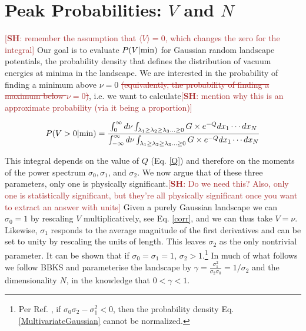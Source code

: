 \documentclass[12pt]{article}
\newcommand{\re}[1]{\textcolor{blue}{[{\bf RE}: #1]}}
\newcommand{\SH}[1]{\textcolor{brown}{[{\bf SH}: #1]}}
\newcommand{\sh}[1]{\textcolor{brown}{#1}}
\begin{document}



\section{Peak Probabilities: $V$ and $N$} \label{PeakNumbers}
\SH{remember the assumption that $\langle V\rangle = 0$, which changes the zero for the integral}
Our goal  is to evaluate $P(V|{\rm min})$ for  Gaussian random landscape potentials, the probability density that defines the distribution of vacuum energies at minima in the landscape. We are interested in the probability of finding a minimum above $\nu = 0$ \sh{\sout{(equivalently, the probability of finding a maximum below $\nu = 0$)}}, i.e. we want to calculate\SH{mention why this is an approximate probability (via it being a proportion)}

\begin{equation} \label{PminIntegral}
P(V>0|{\rm min}) =  \frac{\int^\infty_0 d\nu \int_{\lambda_1 \geq \lambda_2 \geq \lambda_3 \ldots \geq 0} G \times e^{-Q} dx_1  \cdots dx_N}{\int^\infty_{-\infty} d\nu \int_{\lambda_1 \geq \lambda_2 \geq \lambda_3 \ldots \geq 0} G \times e^{-Q} dx_1  \cdots dx_N}
\end{equation}

This integral depends on the value of $Q$ (Eq. \ref{Q})  and therefore on the moments of the power spectrum $\sigma_0, \sigma_1$,  and $\sigma_2$. We now argue that of these three parameters, only one is physically significant.\SH{Do we need this? Also, only one is statistically significant, but they're all physically significant once you want to extract an answer with units} Given a purely Gaussian landscape we can $\sigma_0=1$ by rescaling $V$ multiplicatively, see Eq. \ref{corr}, and we can thus take $V = \nu$. Likewise, $\sigma_1$ responds to the average magnitude of the first derivatives and can be set to unity by rescaling the units of length. This leaves $\sigma_2$ as the only nontrivial parameter. It can be shown that if $\sigma_0=\sigma_1=1$, $\sigma_2>1$.\footnote{Per Ref. \cite{Yamada2018}, if $\sigma_0\sigma_2 - \sigma_1^2 < 0$, then the probability density Eq. \ref{MultivariateGaussian} cannot be normalized.} In much of what follows we follow BBKS and parameterise the landscape by $\gamma = \frac{\sigma_1^2}{\sigma_2 \sigma_0}=1/\sigma_2$ and the dimensionality $N$,  in the knowledge that $0<\gamma<1$.
\end{document}
